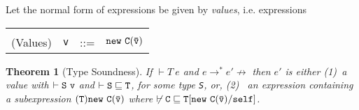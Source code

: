 \documentclass[nocopyrightspace,preprint,10pt]{sigplanconf}
\newcommand{\starderives}{\derives^*}
\def\derives{\longrightarrow}
\newtheorem{theorem}{Theorem}[section]
\def\subtype{\sqsubseteq}
\begin{document}
Let the normal form of expressions be given by {\em values},
i.e. expressions 

\begin{tabular}{rrcl}
&&&\\
(Values) & {\tt v} &{::=}& $\mbox{\tt new}\ {\tt C(\bar{\tt v})}$
\end{tabular}


\begin{theorem}[Type Soundness] 

If $\vdash T\ e$ and $e \starderives e' \not\derives$ then $e'$ is
either (1)~a value {\tt } with $\vdash {\tt S\ v}$ and $\vdash {\tt S
\subtype T}$, for some type {\tt S}, or, (2)~ an expression containing
a subexpression ${\tt (T)\mbox{\tt new}\ C(\bar{\tt v})}$ where 
$\not\vdash \tt C\subtype T[\new\ C(\bar{\tt v})/\self]$.

\end{theorem}
\end{document}
